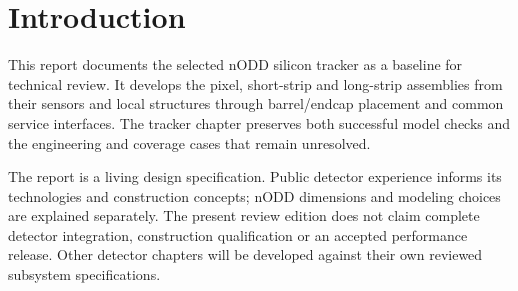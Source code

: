 %

\chapter{Introduction}
\label{ch:introduction}
This report documents the selected nODD silicon tracker as a baseline for
technical review. It develops the pixel, short-strip and long-strip assemblies
from their sensors and local structures through barrel/endcap placement and
common service interfaces. The tracker chapter preserves both successful model
checks and the engineering and coverage cases that remain unresolved.

The report is a living design specification. Public detector experience informs
its technologies and construction concepts; nODD dimensions and modeling
choices are explained separately. The present review edition does not claim
complete detector integration, construction qualification or an accepted
performance release. Other detector chapters will be developed against their
own reviewed subsystem specifications.
